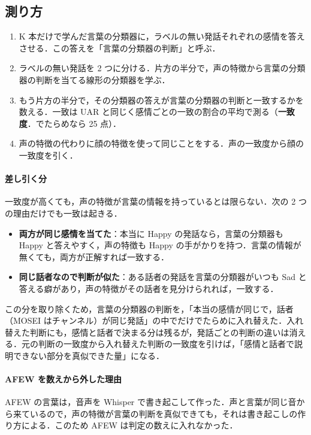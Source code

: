 \documentclass[a4paper,11pt]{ltjsarticle}
\begin{document}
\subsection{測り方}

\begin{enumerate}
  \item K 本だけで学んだ言葉の分類器に，ラベルの無い発話それぞれの感情を答えさせる．この答えを「言葉の分類器の判断」と呼ぶ．
  \item ラベルの無い発話を 2 つに分ける．片方の半分で，声の特徴から言葉の分類器の判断を当てる線形の分類器を学ぶ．
  \item もう片方の半分で，その分類器の答えが言葉の分類器の判断と一致するかを数える．一致は UAR と同じく感情ごとの一致の割合の平均で測る（\textbf{一致度}．でたらめなら 25 点）．
  \item 声の特徴の代わりに顔の特徴を使って同じことをする．声の一致度から顔の一致度を引く．
\end{enumerate}

\paragraph{差し引く分}
一致度が高くても，声の特徴が言葉の情報を持っているとは限らない．次の 2 つの理由だけでも一致は起きる．
\begin{itemize}
  \item \textbf{両方が同じ感情を当てた}：本当に Happy の発話なら，言葉の分類器も Happy と答えやすく，声の特徴も Happy の手がかりを持つ．言葉の情報が無くても，両方が正解すれば一致する．
  \item \textbf{同じ話者なので判断が似た}：ある話者の発話を言葉の分類器がいつも Sad と答える癖があり，声の特徴がその話者を見分けられれば，一致する．
\end{itemize}
この分を取り除くため，言葉の分類器の判断を，「本当の感情が同じで，話者（MOSEI はチャンネル）が同じ発話」の中でだけでたらめに入れ替えた．入れ替えた判断にも，感情と話者で決まる分は残るが，発話ごとの判断の違いは消える．元の判断の一致度から入れ替えた判断の一致度を引けば，「感情と話者で説明できない部分を真似できた量」になる．

\paragraph{AFEW を数えから外した理由}
AFEW の言葉は，音声を Whisper で書き起こして作った．声と言葉が同じ音から来ているので，声の特徴が言葉の判断を真似できても，それは書き起こしの作り方による．このため AFEW は判定の数えに入れなかった．
\end{document}
